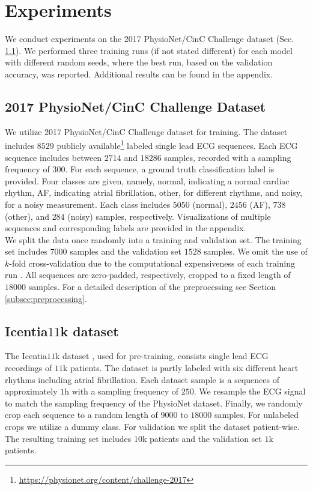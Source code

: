 \section{Experiments} \label{sec:experiments}

We conduct experiments on the 2017 PhysioNet/CinC Challenge dataset \cite{Clifford2017} (Sec. \ref{subsec:physionet_dataset}). We performed three training runs (if not stated different) for each model with different random seeds, where the best run, based on the validation accuracy, was reported. Additional results can be found in the appendix.

\subsection{2017 PhysioNet/CinC Challenge Dataset} \label{subsec:physionet_dataset}

We utilize 2017 PhysioNet/CinC Challenge dataset \cite{Clifford2017} for training. The dataset includes $8529$ publicly available\footnote{\url{https://physionet.org/content/challenge-2017}} labeled single lead ECG sequences. Each ECG sequence includes between $2714$ and $18286$ samples, recorded with a sampling frequency of $300$. For each sequence, a ground truth classification label is provided. Four classes are given, namely, normal, indicating a normal cardiac rhythm, AF, indicating atrial fibrillation, other, for different rhythms, and noisy, for a noisy measurement. Each class includes $5050$ (normal), $2456$ (AF), $738$ (other), and $284$ (noisy) samples, respectively. Visualizations of multiple sequences and corresponding labels are provided in the appendix. \\
\indent We split the data once randomly into a training and validation set. The training set includes $7000$ samples and the validation set $1528$ samples. We omit the use of $k$-fold cross-validation due to the computational expensiveness of each training run \cite{Bishop2006, Goodfellow2016}. All sequences are zero-padded, respectively, cropped to a fixed length of $18000$ samples. For a detailed description of the preprocessing see Section \ref{subsec:preprocessing}.

\subsection{Icentia$11$k dataset} \label{subsec:icentia11k_dataset}

The Icentia$11$k dataset \cite{Tan2019}, used for pre-training, consists single lead ECG recordings of $11\si{\kilo}$ patients. The dataset is partly labeled with six different heart rhythms including atrial fibrillation. Each dataset sample is a sequences of approximately $1\si{\hour}$ with a sampling frequency of $250$. We resample the ECG signal to match the sampling frequency of the PhysioNet dataset. Finally, we randomly crop each sequence to a random length of $9000$ to $18000$ samples. For unlabeled crops we utilize a dummy class. For validation we split the dataset patient-wise. The resulting training set includes $10\si{\kilo}$ patients and the validation set $1\si{\kilo}$ patients.

